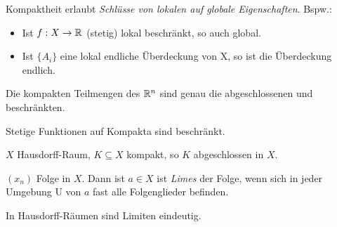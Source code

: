 \begin{bem}
Kompaktheit erlaubt \emph{Schlüsse von lokalen auf globale Eigenschaften}. Bspw.:
\begin{itemize}
	\item Ist $f: X \to \mathbb R$ (stetig) lokal beschränkt, so auch global.
	\item Ist $\{A_i\}$ eine lokal endliche Überdeckung von X, so ist die Überdeckung endlich. \\
\end{itemize}
\end{bem}

\begin{satz} Die kompakten Teilmengen des $\mathbb R^n$ sind genau die abgeschlossenen und beschränkten.
\end{satz}

\begin{kor}
Stetige Funktionen auf Kompakta sind beschränkt.
\end{kor}
\begin{kor}
$X$ Hausdorff-Raum, $K \subseteq X$ kompakt, so $K$ abgeschlossen in $X$. \\
\end{kor}


\begin{defi}[Limes]
$(x_n)$ Folge in $X$. Dann ist $a \in X$ ist \emph{Limes} der Folge, wenn sich in jeder Umgebung U von $a$ fast alle Folgenglieder befinden.
\end{defi}
\begin{bem}
In Hausdorff-Räumen sind Limiten eindeutig.
\end{bem}
